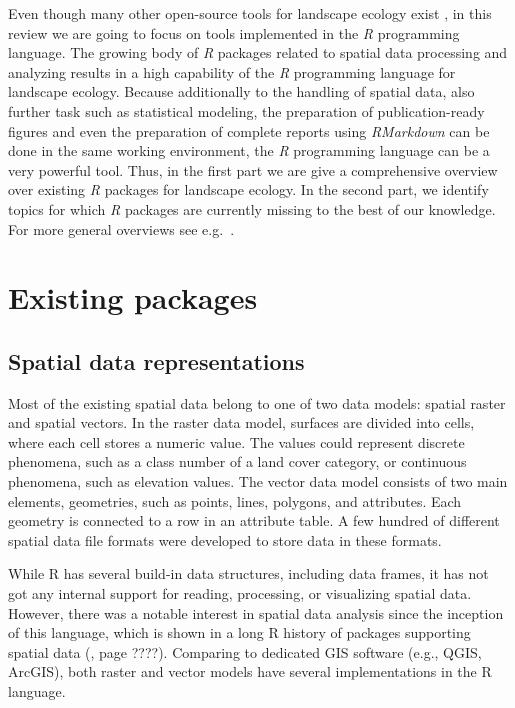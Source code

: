 \documentclass[smallextended]{svjour3}       %
\begin{document}
Even though many other open-source tools for landscape ecology exist \cite{QGISDevelopmentTeam2016,GRASSDevelopmentTeam2017,Porta2017}, in this review we are going to focus on tools implemented in the \emph{R} programming language.
The growing body of \emph{R} packages related to spatial data processing and analyzing results in a high capability of the \emph{R} programming language for landscape ecology.
Because additionally to the handling of spatial data, also further task such as statistical modeling, the preparation of publication-ready figures and even the preparation of complete reports using \emph{RMarkdown} \cite{Xie2018} can be done in the same working environment, the \emph{R} programming language can be a very powerful tool.
Thus, in the first part we are give a comprehensive overview over existing \emph{R} packages for landscape ecology.
In the second part, we identify topics for which \emph{R} packages are currently missing to the best of our knowledge.
For more general overviews see e.g.~\cite{Jolma2008,Steiniger2009,Steiniger2009a,Istvan2012}.

\hypertarget{sec:existing_packages}{%
\section{Existing packages}\label{sec:existing_packages}}

\hypertarget{spatrep}{%
\subsection{Spatial data representations}\label{spatrep}}

Most of the existing spatial data belong to one of two data models: spatial raster and spatial vectors.
In the raster data model, surfaces are divided into cells, where each cell stores a numeric value.
The values could represent discrete phenomena, such as a class number of a land cover category, or continuous phenomena, such as elevation values.
The vector data model consists of two main elements, geometries, such as points, lines, polygons, and attributes.
Each geometry is connected to a row in an attribute table.
A few hundred of different spatial data file formats were developed to store data in these formats.

While R has several build-in data structures, including data frames, it has not got any internal support for reading, processing, or visualizing spatial data.
However, there was a notable interest in spatial data analysis since the inception of this language, which is shown in a long R history of packages supporting spatial data (\cite{Lovelace2019}, page ????).
Comparing to dedicated GIS software (e.g., QGIS, ArcGIS), both raster and vector models have several implementations in the R language.
\end{document}
